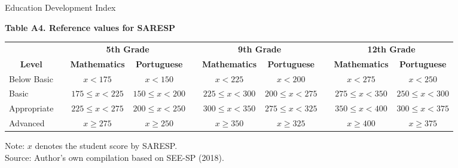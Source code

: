 \documentclass{beamer}
\begin{document}
\begin{frame}[label=SARESP]{Education Development Index}
\begin{table}[H]
  \centering
            \label{table:ReferenceSARESP}                        \centering            \textbf{Table A4. Reference values for SARESP} \vspace{2pt} \\ 
  \begin{adjustbox}{width=1\textwidth}
    \begin{tabular}{lrcccccccc}
    \toprule
     &       & \multicolumn{2}{c}{\textbf{5th Grade}} &       & \multicolumn{2}{c}{\textbf{9th Grade}} &       & \multicolumn{2}{c}{\textbf{12th Grade}} \\
\cmidrule{3-4}\cmidrule{6-7}\cmidrule{9-10}    \multicolumn{1}{c}{\textbf{Level}} &       & \textbf{Mathematics} & \textbf{Portuguese} &       & \textbf{Mathematics} & \textbf{Portuguese} &       & \textbf{Mathematics} & \textbf{Portuguese} \\
    \midrule
    \midrule
    Below Basic &       & $x < 175$ & $x < 150$ &       & $x < 225$ & $x < 200$ &       & $x < 275$ & $x < 250$ \\
    Basic &       & $175 \leq x < 225$ & $150 \leq x < 200$ &       & $225 \leq x < 300$ & $200 \leq x < 275$ &       & $275 \leq x < 350$ & $250 \leq x < 300$ \\
    Appropriate &       & $225 \leq x < 275$ & $200 \leq x < 250$ &       & $300 \leq x < 350$ & $275 \leq x < 325$ &       & $350 \leq x < 400$ & $300 \leq x < 375$ \\
    Advanced &       & $x \geq 275$ & $x \geq 250$ &       & $x \geq 350$ & $x \geq 325$ &       & $x \geq 400$ & $x \geq 375$ \\
     \bottomrule
      \end{tabular}%
  \label{tab:SARESP}%
\end{adjustbox}
\end{table}%

\vspace{-9pt} 
    \begin{minipage}{1\textwidth} 
{\tiny
Note: $x$ denotes the student score by SARESP. \vspace{-1pt}\\ Source: Author's own compilation based on SEE-SP (2018). \par}
\end{minipage} 
\vspace{5pt}
\end{frame}
\end{document}

